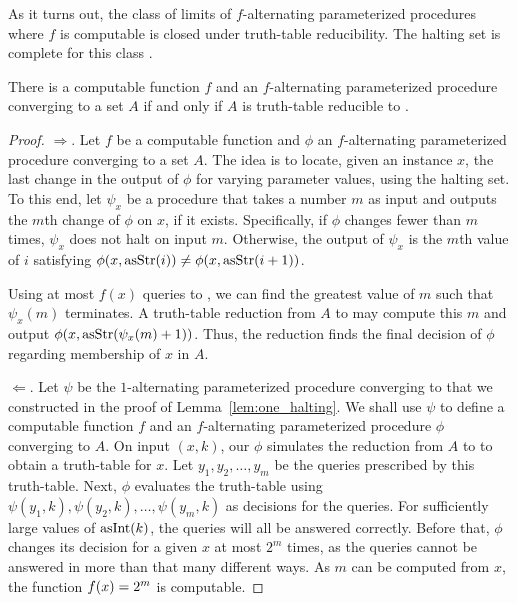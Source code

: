 As it turns out, the class of limits of $f$-alternating parameterized procedures where $f$ is computable is closed under truth-table reducibility.
The halting set is complete for this class \parencite{epstein1981hierarchies,arslanov1997degree,downey2010algorithmic}.
\begin{theorem}
\label{thm:truthtable_halt}
  There is a computable function $f$ and an $f$-alternating parameterized procedure converging to a set $A$ if and only if $A$ is truth-table reducible to .
\end{theorem}
\begin{proof}
  $\Longrightarrow$.
  Let $f$ be a computable function and $\phi$ an $f$-alternating parameterized procedure converging to a set $A$.
  The idea is to locate, given an instance $x$, the last change in the output of $\phi$ for varying parameter values, using the halting set.
  To this end, let $\psi_x$ be a procedure that takes a number $m$ as input and outputs the $m$th change of $\phi$ on $x$, if it exists.
  Specifically, if $\phi$ changes fewer than $m$ times, $\psi_x$ does not halt on input $m$.
  Otherwise, the output of $\psi_x$ is the $m$th value of $i$ satisfying $\phi(x, \operatorname{asStr}(i)) \neq \phi(x, \operatorname{asStr}(i + 1))$.

  Using at most $f(x)$ queries to , we can find the greatest value of $m$ such that $\psi_x(m)$ terminates.
  A truth-table reduction from $A$ to  may compute this $m$ and output $\phi(x, \operatorname{asStr}(\psi_x(m) + 1))$.
  Thus, the reduction finds the final decision of $\phi$ regarding membership of $x$ in $A$.

  $\Longleftarrow$.
  Let $\psi$ be the $1$-alternating parameterized procedure converging to  that we constructed in the proof of Lemma~\ref{lem:one_halting}.
  We shall use $\psi$ to define a computable function $f$ and an $f$-alternating parameterized procedure $\phi$ converging to $A$.
  On input $(x, k)$, our $\phi$ simulates the reduction from $A$ to  to obtain a truth-table for $x$.
  Let $y_1, y_2, \ldots, y_m$ be the queries prescribed by this truth-table.
  Next, $\phi$ evaluates the truth-table using $\psi(y_1, k), \psi(y_2, k), \ldots, \psi(y_m, k)$ as decisions for the queries.
  For sufficiently large values of $\operatorname{asInt}(k)$, the queries will all be answered correctly.
  Before that, $\phi$ changes its decision for a given $x$ at most $2^m$ times, as the queries cannot be answered in more than that many different ways.
  As $m$ can be computed from $x$, the function $f(x) = 2^m$ is computable.
\end{proof}

